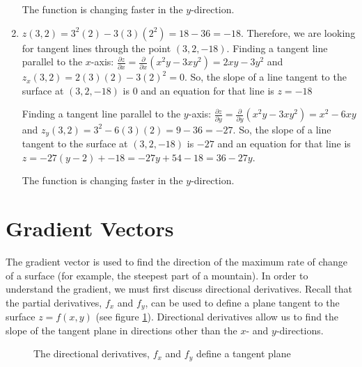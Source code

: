 \begin{Answer}[ref = tangent]
\begin{enumerate}
    The function is changing faster in the $y$-direction.

    \item $z(3, 2) = 3^2(2) - 3(3)(2^2) = 18 - 36 = -18$. Therefore, we are 
    looking for tangent lines through the point $(3, 2, -18)$. Finding a 
    tangent line parallel to the $x$-axis: $\frac{\partial z}{\partial x} = 
    \frac{\partial}{\partial x} \left( x^2y - 3xy^2 \right) = 2xy - 3y^2$ and 
    $z_x(3, 2) = 2(3)(2) - 3(2)^2 = 0$. So, the slope of a line tangent to the 
    surface at $(3, 2, -18)$ is $0$ and an equation for that line is $z = -18$

    Finding a tangent line parallel to the $y$-axis: $\frac{\partial z}{
    \partial y} = \frac{\partial}{\partial y} \left( x^2y - 3xy^2 \right) = 
    x^2 - 6xy$ and $z_y(3, 2) = 3^2 - 6(3)(2) = 9 - 36 = -27$. So, the slope of 
    a line tangent to the surface at $(3, 2, -18)$ is $-27$ and an equation for
    that line is $z = -27(y - 2) + -18 = -27y + 54 - 18 = 36 - 27y$.

    The function is changing faster in the $y$-direction. 
\end{enumerate}
\end{Answer}

\section{Gradient Vectors}
The gradient vector is used to find the direction of the maximum rate of change 
of a surface (for example, the steepest part of a mountain). In order to 
understand the gradient, we must first discuss directional derivatives. Recall 
that the partial derivatives, $f_x$ and $f_y$, can be used to define a plane 
tangent to the surface $z = f(x,y)$ (see figure \ref{fig:plane}). Directional 
derivatives allow us to find the slope of the tangent plane in directions 
other than the $x$- and $y$-directions. 

\begin{figure}[htbp]
    \centering
    \caption{The directional derivatives, $f_x$ and $f_y$ define a tangent 
    plane}
    \label{fig:plane}
\end{figure}

